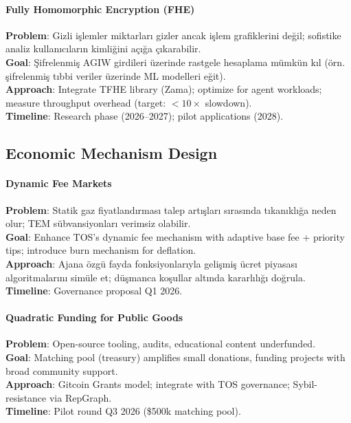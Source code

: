 \documentclass[11pt]{article}
\begin{document}
\begin{itemize}[noitemsep]
\begin{itemize}[noitemsep]
\begin{itemize}[noitemsep]
\begin{itemize}[noitemsep]
\begin{itemize}[noitemsep]
\begin{itemize}[noitemsep]
\begin{itemize}[noitemsep]
\begin{enumerate}[noitemsep]
\begin{itemize}[noitemsep]
\paragraph{Fully Homomorphic Encryption (FHE)}
\textbf{Problem}: Gizli işlemler miktarları gizler ancak işlem grafiklerini değil; sofistike analiz kullanıcıların kimliğini açığa çıkarabilir.\\
\textbf{Goal}: Şifrelenmiş AGIW girdileri üzerinde rastgele hesaplama mümkün kıl (örn. şifrelenmiş tıbbi veriler üzerinde ML modelleri eğit).\\
\textbf{Approach}: Integrate TFHE library (Zama); optimize for agent workloads; measure throughput overhead (target: $<10\times$ slowdown).\\
\textbf{Timeline}: Research phase (2026--2027); pilot applications (2028).

\subsection{Economic Mechanism Design}

\paragraph{Dynamic Fee Markets}
\textbf{Problem}: Statik gaz fiyatlandırması talep artışları sırasında tıkanıklığa neden olur; TEM sübvansiyonları verimsiz olabilir.\\
\textbf{Goal}: Enhance TOS's dynamic fee mechanism with adaptive base fee + priority tips; introduce burn mechanism for deflation.\\
\textbf{Approach}: Ajana özgü fayda fonksiyonlarıyla gelişmiş ücret piyasası algoritmalarını simüle et; düşmanca koşullar altında kararlılığı doğrula.\\
\textbf{Timeline}: Governance proposal Q1 2026.

\paragraph{Quadratic Funding for Public Goods}
\textbf{Problem}: Open-source tooling, audits, educational content underfunded.\\
\textbf{Goal}: Matching pool (treasury) amplifies small donations, funding projects with broad community support.\\
\textbf{Approach}: Gitcoin Grants model; integrate with TOS governance; Sybil-resistance via RepGraph.\\
\textbf{Timeline}: Pilot round Q3 2026 (\$500k matching pool).


\end{itemize}
\end{enumerate}
\end{itemize}
\end{itemize}
\end{itemize}
\end{itemize}
\end{itemize}
\end{itemize}
\end{itemize}
\end{document}
